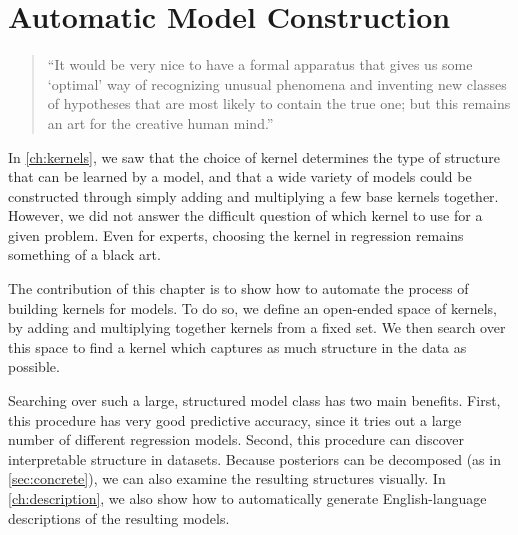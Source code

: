 
\inbpdocument


\chapter{Automatic Model Construction}%
\label{ch:grammar}

\begin{quotation}
``It would be very nice to have a formal apparatus that gives us some `optimal' way of recognizing unusual phenomena and inventing new classes of hypotheses that are most likely to contain the true one; but this remains an art for the creative human mind.''

\hspace*{\fill}
\end{quotation}


In \cref{ch:kernels}, we saw that the choice of kernel determines the type of structure that can be learned by a \gp{} model, and that a wide variety of models could be constructed through simply adding and multiplying a few base kernels together.
However, we did not answer the difficult question of which kernel to use for a given problem.
Even for experts, choosing the kernel in \gp{} regression remains something of a black art.

The contribution of this chapter is to show how to automate the process of building kernels for \gp{} models.
To do so, we define an open-ended space of kernels, by adding and multiplying together kernels from a fixed set.
We then search over this space to find a kernel which captures as much structure in the data as possible.

Searching over such a large, structured model class has two main benefits.
First, this procedure has very good predictive accuracy, since it tries out a large number of different regression models.
Second, this procedure can discover interpretable structure in datasets.
Because \gp{} posteriors can be decomposed (as in \cref{sec:concrete}), we can also examine the resulting structures visually.
In \cref{ch:description}, we also show how to automatically generate English-language descriptions of the resulting models.

